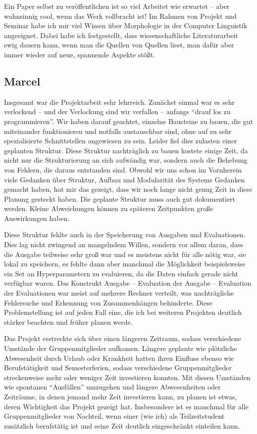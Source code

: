 \documentclass[11pt,a4paper]{article}
\begin{document}
Ein Paper selbst zu veröffentlichen ist so viel Arbeitet wie erwartet -- aber wahnsinnig cool, wenn das Werk vollbracht ist!
Im Rahmen von Projekt und Seminar habe ich mir viel Wissen über Morphologie in der Computer Linguistik angeeignet.
Dabei habe ich festgestellt, dass wissenschaftliche Literaturarbeit ewig dauern kann, wenn man die Quellen von Quellen liest, man dafür aber immer wieder auf neue, spannende Aspekte stößt.

\subsection{Marcel}
Insgesamt war die Projektarbeit sehr lehrreich. Zunächst einmal war es sehr verlockend -- und der Verlockung sind wir verfallen -- anfangs \enquote{drauf los zu programmieren}. Wir haben darauf geachtet, einzelne Bausteine zu bauen, die gut miteinander funktionieren und notfalls austauschbar sind, ohne auf zu sehr spezialisierte Schnittstellen angewiesen zu sein. Leider fiel dies zulasten einer geplanten Struktur. Diese Struktur nachträglich zu bauen kostete einige Zeit, da nicht nur die Strukturierung an sich aufwändig war, sondern auch die Behebung von Fehlern, die daraus entstanden sind. Obwohl wir uns schon im Vornherein viele Gedanken über Struktur, Aufbau und Modularität des Systems Gedanken gemacht haben, hat mir das gezeigt, dass wir noch lange nicht genug Zeit in diese Planung gesteckt haben. Die geplante Struktur muss auch gut dokumentiert werden. Kleine Abweichungen können zu späteren Zeitpunkten große Auswirkungen haben.

Diese Struktur fehlte auch in der Speicherung von Ausgaben und Evaluationen. Dies lag nicht zwingend an mangelndem Willen, sondern vor allem daran, dass die Ausgabe teilweise sehr groß war und es meistens nicht für alle nötig war, sie lokal zu speichern, es fehlte dann aber manchmal die Möglichkeit beispielsweise ein Set an Hyperparametern zu evaluieren, da die Daten einfach gerade nicht verfügbar waren. Das Konstrukt Ausgabe -- Evaluation der Ausgabe -- Evaluation der Evaluationen war meist auf mehrere Rechner verteilt, was nachträgliche Fehlersuche und Erkennung von Zusammenhängen behinderte. Diese Problemstellung ist auf jeden Fall eine, die ich bei weiteren Projekten deutlich stärker beachten und früher planen werde.

Das Projekt erstreckte sich über einen längeren Zeitraum, sodass verschiedene Umstände der Gruppenmitglieder aufkamen. Längere geplante wie plötzliche Abwesenheit durch Urlaub oder Krankheit hatten ihren Einfluss ebenso wie Berufstätigkeit und Semesterferien, sodass verschiedene Gruppenmitglieder streckenweise mehr oder weniger Zeit investieren konnten. Mit diesen Umständen wie spontanen \enquote{Ausfällen} umzugehen und längere Abwesenheiten oder Zeiträume, in denen jemand mehr Zeit investieren kann, zu planen ist etwas, deren Wichtigkeit das Projekt gezeigt hat. Insbesondere ist es manchmal für alle Gruppenmitglieder von Nachteil, wenn einer (wie ich) als Teilzeitstudent zusätzlich berufstätig ist und seine Zeit deutlich eingeschränkt einteilen kann.
\end{document}
